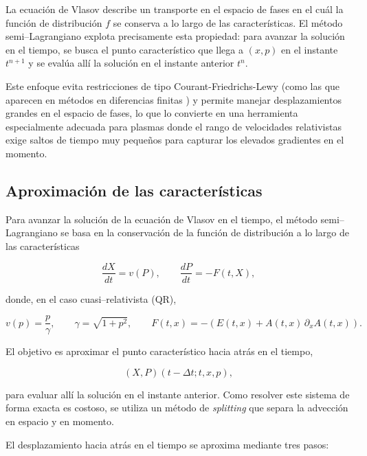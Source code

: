 \documentclass[11pt,a4paper,twoside,pdf]{article}
\numberwithin{equation}{section}
\begin{document}
La ecuación de Vlasov describe un transporte en el espacio de fases en el cuál la
función de distribución $f$ se conserva a lo largo de las características. El método
semi–Lagrangiano explota precisamente esta propiedad: para avanzar la solución en
el tiempo, se busca el punto característico que llega a $(x,p)$ en el instante $t^{n+1}$ y
se evalúa allí la solución en el instante anterior $t^n$.

Este enfoque evita restricciones de tipo Courant-Friedrichs-Lewy (como las que aparecen en métodos en diferencias finitas \cite{dymer2025stable}) y permite manejar desplazamientos
grandes en el espacio de fases, lo que lo convierte en una herramienta especialmente
adecuada para plasmas donde el rango de velocidades relativistas exige saltos de tiempo muy pequeños para capturar los elevados gradientes en el momento.






\subsection{Aproximación de las características}

Para avanzar la solución de la ecuación de Vlasov en el tiempo, el método
semi–Lagrangiano se basa en la conservación de la función de distribución a lo largo
de las características 


\[
\frac{dX}{dt} = v(P), \qquad \frac{dP}{dt} = -F(t,X),
\]


donde, en el caso cuasi–relativista (QR),


\[
v(p) = \frac{p}{\gamma}, \qquad \gamma = \sqrt{1+p^2}, \qquad
F(t,x) = -(E(t,x) + A(t,x)\,\partial_x A(t,x)).
\]



El objetivo es aproximar el punto característico hacia atrás en el tiempo,


\[
(X,P)(t-\Delta t;t,x,p),
\]


para evaluar allí la solución en el instante anterior. Como resolver este sistema de
forma exacta es costoso, se utiliza un método de \emph{splitting} que separa la
advección en espacio y en momento.


El desplazamiento hacia atrás en el tiempo se aproxima mediante tres pasos:
\end{document}
